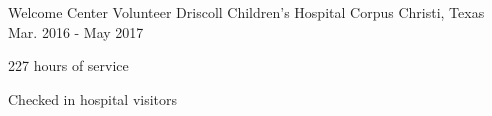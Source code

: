 \begin{cventries}
  \cventry
  	{Welcome Center Volunteer} %
    {Driscoll Children's Hospital} %
    {Corpus Christi, Texas} %
    {Mar. 2016 - May 2017} %
	{
	\begin{cvitems} %
		\item {
			227 hours of service
		}
		\item {
			Checked in hospital visitors
		}
	\end{cvitems}
	}
\end{cventries}
